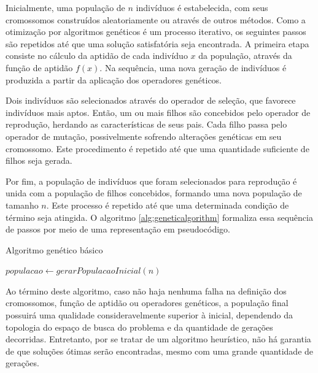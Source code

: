 \documentclass[12pt]{article}
\begin{document}
Inicialmente, uma população de $n$ indivíduos é estabelecida, com seus cromossomos construídos aleatoriamente ou através de outros métodos.
Como a otimização por algoritmos genéticos é um processo iterativo, os seguintes passos são repetidos até que uma solução satisfatória seja encontrada. A primeira etapa consiste no cálculo da aptidão de cada indivíduo $x$ da população, através da função de aptidão $f(x)$. Na sequência, uma nova geração de indivíduos é produzida a partir da aplicação dos operadores genéticos.

Dois indivíduos são selecionados através do operador de seleção, que favorece indivíduos mais aptos. Então, um ou mais filhos são concebidos pelo operador de reprodução, herdando as características de seus pais. Cada filho passa pelo operador de mutação, possivelmente sofrendo alterações genéticas em seu cromossomo. Este procedimento é repetido até que uma quantidade suficiente de filhos seja gerada.

Por fim, a população de indivíduos que foram selecionados para reprodução é unida com a população de filhos concebidos, formando uma nova população de tamanho $n$. Este processo é repetido até que uma determinada condição de término seja atingida. O algoritmo \ref{alg:geneticalgorithm} formaliza essa sequência de passos por meio de uma representação em pseudocódigo.

\begin{algorithm}[ht]
  \small
  \DontPrintSemicolon
  \caption{Algoritmo genético básico}
  \label{alg:geneticalgorithm}
  \BlankLine
  $populacao \leftarrow gerarPopulacaoInicial(n)$ \;
  \BlankLine
  \BlankLine
\end{algorithm}

Ao término deste algoritmo, caso não haja nenhuma falha na definição dos cromossomos, função de aptidão ou operadores genéticos, a população final possuirá uma qualidade consideravelmente superior à inicial, dependendo da topologia do espaço de busca do problema e da quantidade de gerações decorridas. Entretanto, por se tratar de um algoritmo heurístico, não há garantia de que soluções ótimas serão encontradas, mesmo com uma grande quantidade de gerações.
\end{document}
